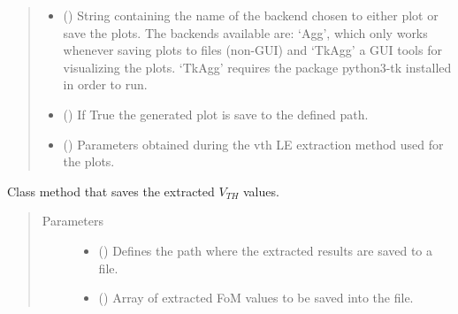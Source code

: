 \documentclass[letterpaper,10pt,english,openany, oneside]{sphinxmanual}
\begin{document}
\begin{fulllineitems}
\begin{fulllineitems}
\begin{quote}
\begin{description}
\begin{itemize}
\item {} 
 () \textendash{} String containing the name of the backend chosen to either plot or save the plots. The backends available are:
‘Agg’, which only works whenever saving plots to files (non-GUI) and ‘TkAgg’ a GUI tools for visualizing the plots.
‘TkAgg’ requires the package python3-tk installed in order to run.

\item {} 
 () \textendash{} If True the generated plot is save to the defined path.

\item {} 
 (\sphinxstyleliteralemphasis{\sphinxupquote{,}}) \textendash{} Parameters obtained during the vth LE extraction method used for the plots.

\end{itemize}

\end{description}\end{quote}

\end{fulllineitems}


\begin{fulllineitems}
\label{\detokenize{index:fompy.fom.vth_ext.save_results_to_file}}
Class method that saves the extracted \(V_{TH}\) values.
\begin{quote}\begin{description}
\item[{Parameters}] \leavevmode\begin{itemize}
\item {} 
 () \textendash{} Defines the path where the extracted results are saved to a file.

\item {} 
 () \textendash{} Array of extracted FoM values to be saved into the file.

\end{itemize}

\end{description}\end{quote}

\end{fulllineitems}


\end{fulllineitems}
\end{document}
